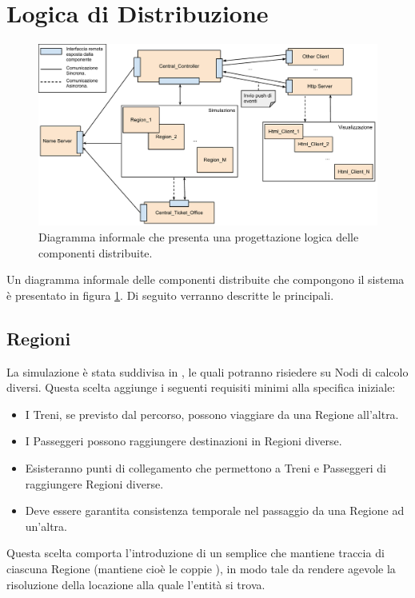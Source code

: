 \section{Logica di Distribuzione}

	\begin{figure}[htbp]
		\begin{center}
			\includegraphics[scale=0.5,trim= 35mm 0mm 0mm 0mm,keepaspectratio]{imgs/logic_distribution.pdf}
			\caption{\footnotesize{Diagramma informale che presenta una progettazione logica delle componenti distribuite.}}
			\label{fig:logic_distribution}
		\end{center}
	\end{figure}

Un diagramma informale delle componenti distribuite che compongono il sistema è presentato in figura \ref{fig:logic_distribution}. Di seguito verranno descritte le principali.
	
	\subsection{Regioni}\label{sec:distr_regioni}
	
	La simulazione è stata suddivisa in , le quali potranno risiedere su Nodi di calcolo diversi. Questa scelta aggiunge i seguenti requisiti minimi alla specifica iniziale:
	\begin{itemize}
		\item I Treni, se previsto dal percorso, possono viaggiare da una Regione all'altra.
		\item I Passeggeri possono raggiungere destinazioni in Regioni diverse.
		\item Esisteranno punti di collegamento che permettono a Treni e Passeggeri di raggiungere Regioni diverse. 
		\item Deve essere garantita consistenza temporale nel passaggio da una Regione ad un'altra.
	\end{itemize}
	Questa scelta comporta l'introduzione di un semplice  che mantiene traccia di ciascuna Regione (mantiene cioè le coppie ), in modo tale da rendere agevole la risoluzione della locazione alla quale l'entità si trova. 
	
